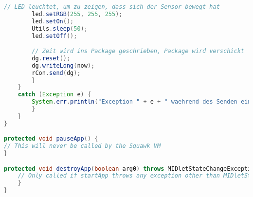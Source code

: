 \begin{lstlisting}[language=Java,caption={Code MovementDetection.java},label=lst:hoststudi,frame=single]
		// LED leuchtet, um zu zeigen, dass sich der Sensor bewegt hat
		led.setRGB(255, 255, 255);
		led.setOn();
		Utils.sleep(50);
		led.setOff();

		// Zeit wird ins Package geschrieben, Package wird verschickt
		dg.reset();
		dg.writeLong(now);
		rCon.send(dg);
		}
	} 
	catch (Exception e) {
		System.err.println("Exception " + e + " waehrend des Senden eines Paketes.");
		}
	}
}

protected void pauseApp() {
// This will never be called by the Squawk VM
}

protected void destroyApp(boolean arg0) throws MIDletStateChangeException {
	// Only called if startApp throws any exception other than MIDletStateChangeException
	}
}
\end{lstlisting}

